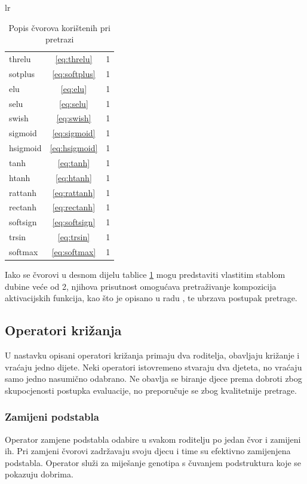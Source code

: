 \documentclass[times, utf8, numeric, diplomski]{fer}
\begin{document}
\begin{table}[H]
\begin{tabular}[t]{lr}
\begin{tabular}[t]{l|c|r}
threlu 	& \eqref{eq:threlu}		& 1 \\
sotplus	& \eqref{eq:softplus}	& 1 \\
elu		& \eqref{eq:elu}			& 1 \\
selu		& \eqref{eq:selu}		& 1 \\
swish	& \eqref{eq:swish}		& 1 \\
sigmoid	& \eqref{eq:sigmoid}		& 1 \\
hsigmoid & \eqref{eq:hsigmoid}	& 1 \\
tanh		& \eqref{eq:tanh}		& 1 \\
htanh 	& \eqref{eq:htanh}		& 1 \\
rattanh & \eqref{eq:rattanh}		& 1 \\
rectanh & \eqref{eq:rectanh}		& 1 \\
softsign	& \eqref{eq:softsign}	& 1 \\
trsin 	& \eqref{eq:trsin}		& 1 \\
softmax	& \eqref{eq:softmax}		& 1 \\
\end{tabular}
\end{tabular}
\caption{Popis čvorova korištenih pri pretrazi}
\label{tab:nodes}
\end{table}


Iako se čvorovi u desnom dijelu tablice \ref{tab:nodes} mogu predstaviti vlastitim stablom dubine veće od 2, njihova prisutnost omogućava pretraživanje kompozicija aktivacijskih funkcija, kao što je opisano u radu \citep{elish}, te ubrzava postupak pretrage.

\newpage

\subsection{Operatori križanja}
U nastavku opisani operatori križanja primaju dva roditelja, obavljaju križanje i vraćaju jedno dijete. Neki operatori istovremeno stvaraju dva djeteta, no vraćaju samo jedno nasumično odabrano. Ne obavlja se biranje djece prema dobroti zbog skupocjenosti postupka evaluacije, no preporučuje se zbog kvalitetnije pretrage.

\subsubsection{Zamijeni podstabla}
Operator zamjene podstabla odabire u svakom roditelju po jedan čvor i zamijeni ih. Pri zamjeni čvorovi zadržavaju svoju djecu i time su efektivno zamijenjena podstabla. Operator služi za miješanje genotipa s čuvanjem podstruktura koje se pokazuju dobrima. %
\end{document}
